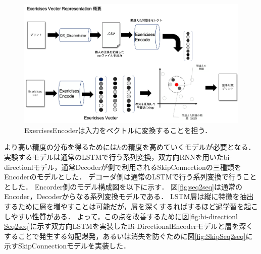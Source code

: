 \documentclass[a4paper,twocolumn]{jsarticle}
\begin{document}
\begin{center}
  \begin{figure}[H]
    \centering
    \includegraphics[width=0.8\linewidth]{image/EVS_Simpie.png}
    \caption{ExercisesEncoderは入力をベクトルに変換することを担う．}
    \label{fig:EVS_Simple}
  \end{figure}
\end{center}

より高い精度の分布を得るためには$h$の精度を高めていくモデルが必要となる．
実験するモデルは通常のLSTMで行う系列変換，双方向RNNを用いたbi-directionlモデル，通常Decoderが側で利用されるSkipConnectionの三種類をEncoderのモデルとした．
デコーダ側は通常のLSTMで行う系列変換で行うこととした．
Encorder側のモデル構成図を以下に示す．
図\ref{fig:seq2seq}は通常のEncoder，Decoderからなる系列変換モデルである．
LSTM層は縦に特徴を抽出するために層を増やすことは可能だが，層を深くするればするほど過学習を起こしやすい性質がある．
よって，この点を改善するために図\ref{fig:bi-directionl Seq2seq}に示す双方向LSTMを実装したBi-DirectionalEncoderモデルと層を深くすることで発生する勾配爆発，あるいは消失を防ぐために図\ref{fig:SkipSeq2seq}に示すSkipConnectionモデルを実装した．
\end{document}
